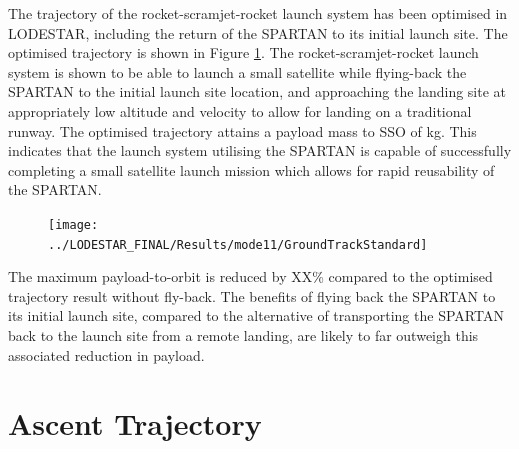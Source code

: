 The trajectory of the rocket-scramjet-rocket launch system has been optimised in LODESTAR, including the return of the SPARTAN to its initial launch site. The optimised trajectory is shown in Figure \ref{fig:GroundTrackStandard}. 
The rocket-scramjet-rocket launch system is shown to be able to launch a small satellite 
while flying-back the SPARTAN to the initial launch site location, and approaching the landing site at appropriately low altitude and velocity to allow for landing on a traditional runway. 
The optimised trajectory attains a payload mass to SSO of \PayloadToOrbitStandard kg. 
This indicates that the launch system utilising the SPARTAN is capable of successfully completing a small satellite launch mission which allows for rapid reusability of the SPARTAN. 
\begin{figure}[ht!]
	\centering
	\texttt{[image: ../LODESTAR\_FINAL/Results/mode11/GroundTrackStandard]}
	\caption{}
	\label{fig:GroundTrackStandard}
\end{figure}
The maximum payload-to-orbit is reduced by XX\% compared to the optimised trajectory result without fly-back. The benefits of flying back the SPARTAN to its initial launch site, compared to the alternative of transporting the SPARTAN back to the launch site from a remote landing, are likely to far outweigh this associated reduction in payload. 



\section{Ascent Trajectory}

